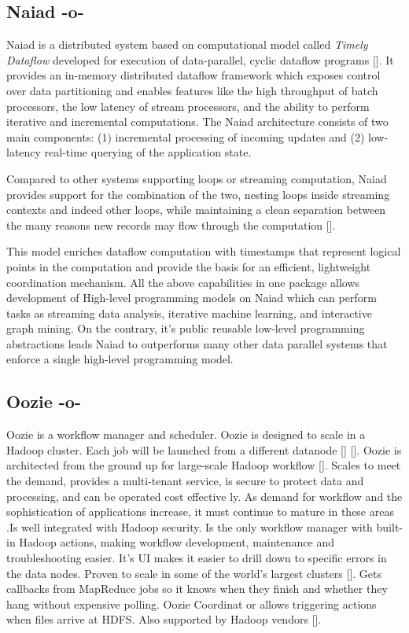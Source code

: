     
\subsection{Naiad -o-}

Naiad is a distributed system based on computational model called
\textit{Timely Dataflow} developed for execution of data-parallel,
cyclic dataflow programs [\cite{paper-naiad}].  It provides an in-memory
distributed dataflow framework which exposes control over data
partitioning and enables features like the high throughput of batch
processors, the low latency of stream processors, and the ability to
perform iterative and incremental computations. The Naiad architecture
consists of two main components: (1) incremental processing of
incoming updates and (2) low-latency real-time querying of the
application state.
    
Compared to other systems supporting loops or streaming computation,
Naiad provides support for the combination of the two, nesting loops
inside streaming contexts and indeed other loops, while maintaining a
clean separation between the many reasons new records may flow through
the computation [\cite{www-naiad}].
    
This model enriches dataflow computation with timestamps that
represent logical points in the computation and provide the basis for
an efficient, lightweight coordination mechanism.  All the above
capabilities in one package allows development of High-level
programming models on Naiad which can perform tasks as streaming data
analysis, iterative machine learning, and interactive graph mining. On
the contrary, it's public reusable low-level programming abstractions
leads Naiad to outperforms many other data parallel systems that
enforce a single high-level programming model.


    
\subsection{Oozie -o-}

Oozie is a workflow manager and scheduler. Oozie is designed to scale
in a Hadoop cluster. Each job will be launched from a different
datanode [\cite{paper-Oozie}] [\cite{www-Oozie1}]. Oozie is architected
from the ground up for large-scale Hadoop workflow [\cite{www-Oozie2}].
Scales to meet the demand, provides a multi-tenant service, is secure
to protect data and processing, and can be operated cost effective
ly. As demand for workflow and the sophistication of applications
increase, it must continue to mature in these areas
\cite{paper-Oozie}.Is well integrated with Hadoop security. Is the
only workflow manager with built-in Hadoop actions, making workflow
development, maintenance and troubleshooting easier. It's UI makes it
easier to drill down to specific errors in the data nodes. Proven to
scale in some of the world's largest clusters [\cite{paper-Oozie}]. Gets
callbacks from MapReduce jobs so it knows when they finish and whether
they hang without expensive polling. Oozie Coordinat or allows
triggering actions when files arrive at HDFS. Also supported by Hadoop
vendors [\cite{paper-Oozie}].





